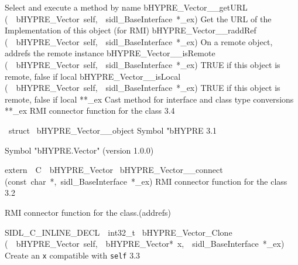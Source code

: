 \documentclass{article}
\begin{document}
\begin{cxxentry}
\begin{cxxnames}
        {
Select and execute a method by name}
        {}
\label{cxx.3.12}
        {bHYPRE\_Vector\_\_getURL}
        {(\ \ bHYPRE\_Vector\ self,\ \ sidl\_BaseInterface\ *\_ex)}
        {
Get the URL of the Implementation of this object (for RMI)}
        {}
\label{cxx.3.13}
        {bHYPRE\_Vector\_\_raddRef}
        {(\ \ bHYPRE\_Vector\ self,\ \ sidl\_BaseInterface\ *\_ex)}
        {
On a remote object, addrefs the remote instance}
        {}
\label{cxx.3.14}
        {bHYPRE\_Vector\_\_isRemote}
        {(\ \ bHYPRE\_Vector\ self,\ \ sidl\_BaseInterface\ *\_ex)}
        {
TRUE if this object is remote, false if local}
        {}
\label{cxx.3.15}
        {bHYPRE\_Vector\_\_isLocal}
        {(\ \ bHYPRE\_Vector\ self,\ \ sidl\_BaseInterface\ *\_ex)}
        {
TRUE if this object is remote, false if local}
        {}
\label{cxx.3.16}
        {**\_ex}
        {}
        {
Cast method for interface and class type conversions}
        {}
\label{cxx.3.17}
        {**\_ex}
        {}
        {
RMI connector function for the class}
        {3.4}
\end{cxxnames}
\begin{cxxvariable}
{\ struct\ }
        {bHYPRE\_Vector\_\_object}
        {}
        {
Symbol "bHYPRE}
        {3.1}
\begin{cxxdoc}

Symbol "bHYPRE.Vector" (version 1.0.0)
\end{cxxdoc}
\end{cxxvariable}
\begin{cxxfunction}
{extern\ \ C\ \ bHYPRE\_Vector\ }
        {bHYPRE\_Vector\_\_connect}
        {(const\ char\ *,\ sidl\_BaseInterface\ *\_ex)}
        {
RMI connector function for the class}
        {3.2}
\begin{cxxdoc}

RMI connector function for the class.(addrefs)
\end{cxxdoc}
\end{cxxfunction}
\begin{cxxfunction}
{SIDL\_C\_INLINE\_DECL\ \ int32\_t\ }
        {bHYPRE\_Vector\_Clone}
        {(\ \ bHYPRE\_Vector\ self,\ \ bHYPRE\_Vector*\ x,\ \ sidl\_BaseInterface\ *\_ex)}
        {
Create an {\tt x} compatible with {\tt self}}
        {3.3}
\begin{cxxdoc}


\end{cxxdoc}
\end{cxxfunction}
\end{cxxentry}
\end{document}
